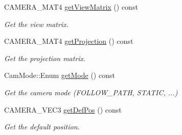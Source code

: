 \begin{DoxyCompactItemize}
C\+A\+M\+E\+R\+A\+\_\+\+M\+A\+T4 \hyperlink{class_camera_aa2e2289caff32f9ac552f1e5c6c7931f}{get\+View\+Matrix} () const
\begin{DoxyCompactList}\small\item\em Get the view matrix. \end{DoxyCompactList}\item 
C\+A\+M\+E\+R\+A\+\_\+\+M\+A\+T4 \hyperlink{class_camera_ab6bf7c26da92eb1806f0787eb35e540c}{get\+Projection} () const
\begin{DoxyCompactList}\small\item\em Get the projection matrix. \end{DoxyCompactList}\item 
Cam\+Mode\+::\+Enum \hyperlink{class_camera_ab508959139d8555dce6f444e44fc01ed}{get\+Mode} () const
\begin{DoxyCompactList}\small\item\em Get the camera mode (F\+O\+L\+L\+O\+W\+\_\+\+P\+A\+TH, S\+T\+A\+T\+IC, ...) \end{DoxyCompactList}\item 
C\+A\+M\+E\+R\+A\+\_\+\+V\+E\+C3 \hyperlink{class_camera_aae10133175e34f9856c48cdb294279df}{get\+Def\+Pos} () const
\begin{DoxyCompactList}\small\item\em Get the default position. \end{DoxyCompactList}\end{DoxyCompactItemize}
